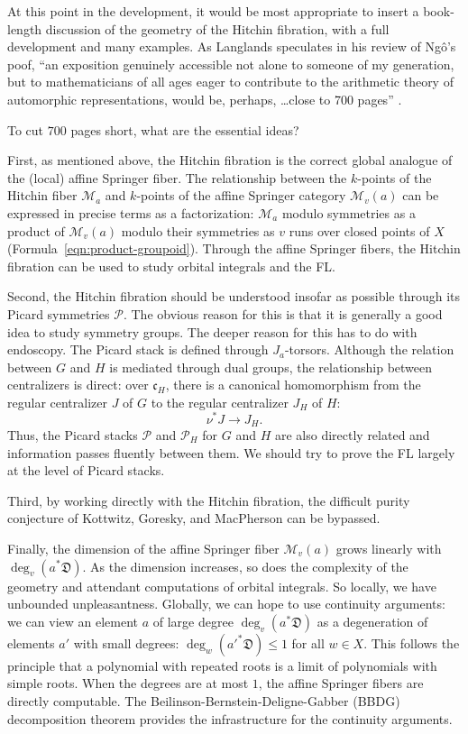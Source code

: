 \documentclass[brochure,english,12pt]{bourbaki}
\def\cc{\mathfrak{c}}
\def\DIV{{\mathfrak{D}}}
\def\M{{\mathcal M}}
\def\P{{\mathcal P}}
\begin{document}
At this point in the development, it would be most appropriate to
insert a book-length discussion of the geometry of the Hitchin
fibration, with a full development and many examples.  As Langlands
speculates in his review of Ng\^o's poof, ``an exposition genuinely
accessible not alone to someone of my generation, but to
mathematicians of all ages eager to contribute to the arithmetic
theory of automorphic representations, would be, perhaps, \ldots close
to 700 pages'' \cite{L:Ngo}.

To cut  $700$ pages short, what are the essential ideas?  

First, as mentioned above, the Hitchin fibration is the correct global
analogue of the (local) affine Springer fiber.  The relationship
between the $k$-points of the Hitchin fiber $\M_a$ and $k$-points
of the affine Springer category $\M_v(a)$ can be expressed in
precise terms as a factorization: $\M_a$ modulo
symmetries as a product of $\M_v(a)$ modulo their symmetries as $v$
runs over closed points of $X$ (Formula~\ref{eqn:product-groupoid}).  Through
the affine Springer fibers, the Hitchin fibration can be used to study
orbital integrals and the FL.

Second, the Hitchin fibration should be understood insofar as possible
through its Picard symmetries $\P$.  The obvious reason for this is that it
is generally a good idea to study symmetry groups.  The deeper reason
for this has to do with endoscopy.  The Picard stack is defined through
$J_a$-torsors.  Although the relation between $G$ and $H$ is mediated
through dual groups, the relationship between centralizers is direct:
over $\cc_H$, there is a canonical homomorphism from the regular
centralizer $J$ of $G$ to the regular centralizer $J_H$ of $H$:
\begin{equation}\label{eqn:JH}
\nu^*J\to J_H.
\end{equation}
Thus, the Picard stacks $\P$ and $\P_H$ for $G$ and $H$ are also
directly related and information passes fluently between them.  We should try to prove the FL
 largely at the level of Picard stacks.

Third, by working directly with the Hitchin fibration, the difficult
purity conjecture of Kottwitz, Goresky, and MacPherson can be
bypassed.

Finally, the dimension of the affine Springer fiber $\M_v(a)$ grows
linearly with $\deg_v(a^* \DIV)$.  As the dimension increases, so does
the complexity of the geometry and attendant computations of orbital
integrals.  So locally, we have unbounded unpleasantness.  Globally, we
can hope to use continuity arguments: we can view an element $a$ of
large degree $\deg_v(a^*\DIV)$ as a degeneration of elements $a'$ with
small degrees: $\deg_w({a'}^*\DIV)\le 1$ for all $w\in X$.  This
follows the principle that a polynomial with repeated roots is a
limit of polynomials with simple roots.  When the degrees are
at most $1$, the affine Springer fibers are directly computable.  The
Beilinson-Bernstein-Deligne-Gabber (BBDG) decomposition theorem provides the
infrastructure for the continuity arguments.
\end{document}

